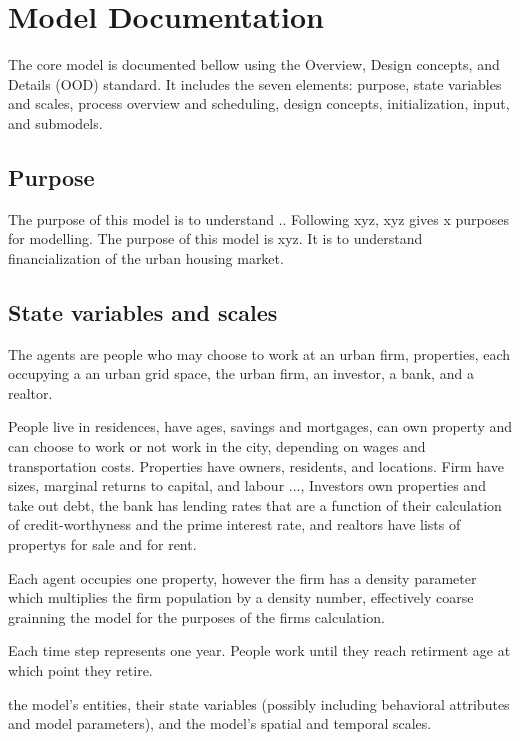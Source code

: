 \chapter{Model Documentation}

The core model is documented bellow using the Overview, Design concepts, and Details (OOD) standard. It includes the seven elements: purpose, state variables and scales, process overview and scheduling, design concepts, initialization, input, and submodels.

\section{Purpose}

The purpose of this model is to understand ..
Following xyz, xyz gives x purposes for modelling. The purpose of this model is xyz. It is to understand financialization of the urban housing market. 


\section{State variables and scales}

The agents are people who may choose to work at an urban firm, properties, each occupying a an urban grid space, the urban firm, an investor, a bank, and a realtor.

People live in residences, have ages, savings and mortgages, can own property and can choose to work or not work in the city, depending on wages and transportation costs. Properties have owners, residents, and locations. Firm have sizes, marginal returns to capital, and labour ..., 
Investors own properties and take out debt, the bank has lending rates that are a function of their calculation of credit-worthyness and the prime interest rate, and realtors have lists of propertys for sale and for rent. 

Each agent occupies one property, however the firm has a density parameter which multiplies the firm population by a density number, effectively coarse grainning the model for the purposes of the firms calculation.

Each time step represents one year. People work until they reach retirment age at which point they retire. 

the model’s entities, their state variables (possibly including behavioral attributes and model parameters), and the model’s spatial and temporal scales.

